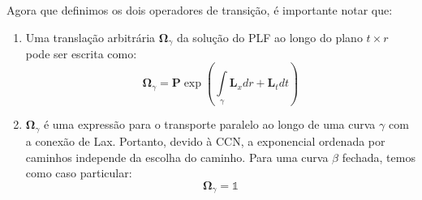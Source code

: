 \documentclass[25pt]{article}
\numberwithin{equation}{subsection} %
\newcommand{\OP}[1]{\mathbf{#1}}
\begin{document}
Agora que definimos os dois operadores de transição, é importante notar que:
\begin{enumerate}
\item Uma translação arbitrária $\bm{\Omega}_{\gamma}$ da solução do PLF ao longo do plano $t\times r$ pode ser escrita como: $$\bm{\Omega}_{\gamma}=\OP{P}\exp\left(\int\limits_{\gamma}\OP{L}_{x}dr+\OP{L}_{t}dt\right)$$
\item $\bm{\Omega}_{\gamma}$ é uma expressão para o \color{red} transporte paralelo \color{black} ao longo de uma curva $\gamma$ com a conexão de Lax. Portanto, devido à CCN, a exponencial ordenada por caminhos independe da escolha do caminho. Para uma curva $\beta$ fechada, temos como caso particular:
$$\bm{\Omega}_{\gamma}=\mathbb{1}$$
\end{enumerate}
\end{document}
